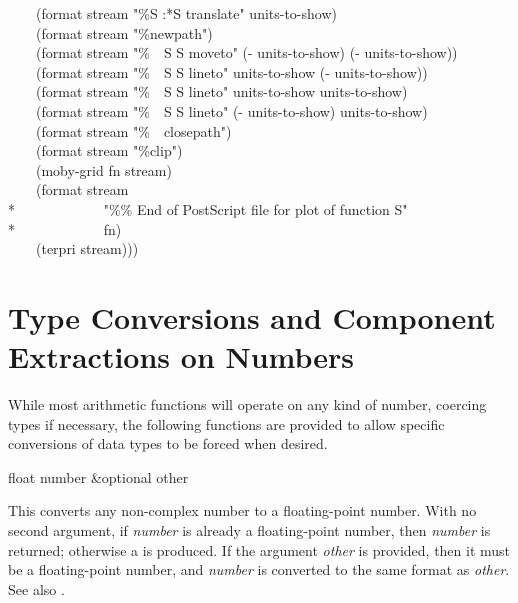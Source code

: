 \begin{new}
\begin{lisp}
~~~~(format stream "{\Xtilde}\%{\Xtilde}S {\Xtilde}:*{\Xtilde}S translate" units-to-show) \\
~~~~(format stream "{\Xtilde}\%newpath") \\
~~~~(format stream "{\Xtilde}\%~~{\Xtilde}S {\Xtilde}S moveto" (- units-to-show) (- units-to-show)) \\
~~~~(format stream "{\Xtilde}\%~~{\Xtilde}S {\Xtilde}S lineto" units-to-show (- units-to-show)) \\
~~~~(format stream "{\Xtilde}\%~~{\Xtilde}S {\Xtilde}S lineto" units-to-show units-to-show) \\
~~~~(format stream "{\Xtilde}\%~~{\Xtilde}S {\Xtilde}S lineto" (- units-to-show) units-to-show) \\
~~~~(format stream "{\Xtilde}\%~~closepath") \\
~~~~(format stream "{\Xtilde}\%clip") \\
~~~~(moby-grid fn stream) \\
~~~~(format stream \\*
~~~~~~~~~~~~"{\Xtilde}\%\% End of PostScript file for plot of function {\Xtilde}S" \\*
~~~~~~~~~~~~fn) \\
~~~~(terpri stream)))
\end{lisp}
\endgroup
\end{new}

\section{Type Conversions and Component Extractions on Numbers}

While most arithmetic functions will operate on any kind of number,
coercing types if necessary, the following functions are provided to
allow specific conversions of data types to be forced when desired.

\begin{defun}[Function]
float number &optional other

This converts any non-complex number to a floating-point number.
With no second argument, if {\it number} is already a floating-point
number, then {\it number} is returned;
otherwise a  is produced.
If the argument {\it other} is provided, then it must be a floating-point
number, and {\it number} is converted to the same format as {\it other}.
See also .
\end{defun}

